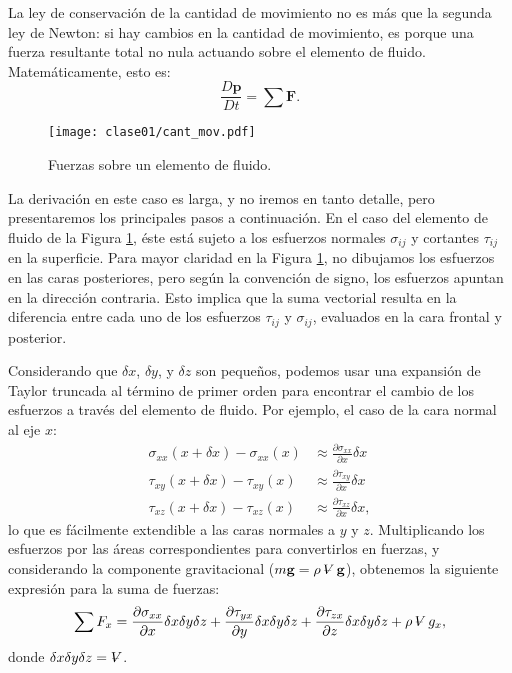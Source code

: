 La ley de conservación de la cantidad de movimiento no es más que la segunda ley de Newton: si hay cambios en la cantidad de movimiento, es porque una fuerza resultante total no nula actuando sobre el elemento de fluido.
Matemáticamente, esto es:
%
\begin{equation}\label{eq:cant_mov}
\frac{D\mathbf{p}}{Dt} = \sum\mathbf{F}.
\end{equation}

\begin{figure}[h!]
\centering
\texttt{[image: clase01/cant\_mov.pdf]}
\caption{Fuerzas sobre un elemento de fluido.}
\label{fig:cant_mov}
\end{figure}

La derivación en este caso es larga, y no iremos en tanto detalle, pero presentaremos los principales pasos a continuación.
En el caso del elemento de fluido de la Figura \ref{fig:cant_mov}, éste está sujeto a los esfuerzos normales $\sigma_{ij}$ y cortantes $\tau_{ij}$ en la superficie.
Para mayor claridad en la Figura \ref{fig:cant_mov}, no dibujamos los esfuerzos en las caras posteriores, pero según la convención de signo, los esfuerzos apuntan en la dirección contraria.
Esto implica que la suma vectorial resulta en la diferencia entre cada uno de los esfuerzos $\tau_{ij}$ y $\sigma_{ij}$, evaluados en la cara frontal y posterior.

Considerando que $\delta x$, $\delta y$, y $\delta z$ son pequeños, podemos usar una expansión de Taylor truncada al término de primer orden para encontrar el cambio de los esfuerzos a través del elemento de fluido.
Por ejemplo, el caso de la cara normal al eje $x$:
%
\begin{align}
\sigma_{xx}(x+\delta x)-\sigma_{xx}(x) &\approx \frac{\partial \sigma_{xx}}{\partial x}\delta x \nonumber \\
\tau_{xy}(x+\delta x)-\tau_{xy}(x) &\approx \frac{\partial \tau_{xy}}{\partial x}\delta x \nonumber \\
\tau_{xz}(x+\delta x)-\tau_{xz}(x) &\approx \frac{\partial \tau_{xz}}{\partial x}\delta x,
\end{align}
%
lo que es fácilmente extendible a las caras normales a $y$ y $z$. 
Multiplicando los esfuerzos por las áreas correspondientes para convertirlos en fuerzas, y considerando la componente gravitacional ($m\mathbf{g}=\rho\vol\mathbf{g}$), obtenemos la siguiente expresión para la suma de fuerzas:
%
\begin{equation}\label{eq:suma_F}
\sum F_x = \frac{\partial \sigma_{xx}}{\partial x}\delta x\delta y \delta z + \frac{\partial \tau_{yx}}{\partial y} \delta x \delta y \delta z + \frac{\partial \tau_{zx}}{\partial z} \delta x \delta y \delta z + \rho \vol g_x,
\end{equation}
%
donde $\delta x \delta y \delta z=\vol$.


